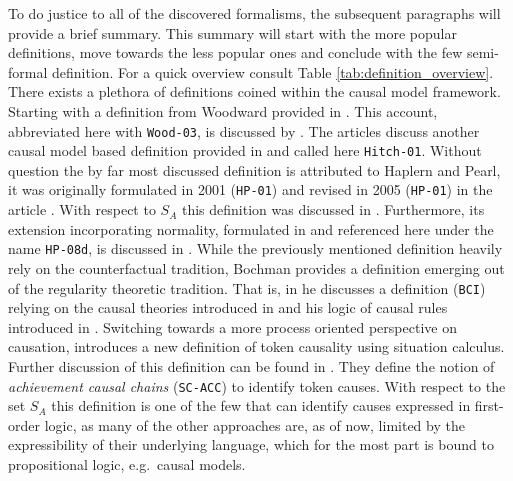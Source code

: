 \documentclass[11pt,a4paper]{book}
\theoremstyle{definition}
\theoremstyle{definition}
\theoremstyle{definition}
\theoremstyle{remark}
\newcommand{\prset}{S_{A}}
\begin{document}
To do justice to all of the discovered formalisms, the subsequent paragraphs will provide a brief summary. This summary will start with the more popular definitions, move towards the less popular ones and conclude with the few semi-formal definition. For a quick overview consult Table \ref{tab:definition_overview}.
There exists a plethora of definitions coined within the causal model framework. 
Starting with a definition from Woodward provided in \parencite{woodward2005making}. This account, abbreviated here with \texttt{Wood-03}, is discussed by \parencite{weslake2015partial,glymour2010actual}. 
The articles \parencite{weslake2015partial, blanchard2017cause} discuss another causal model based definition provided in \parencite{hitchcock2001intransitivity} and called here \texttt{Hitch-01}.
Without question the by far most discussed definition is attributed to Haplern and Pearl, it was originally formulated in 2001 (\texttt{HP-01}) and revised in 2005 (\texttt{HP-01}) in the article \parencite{halpern2005causes}. With respect to $\prset$ this definition was discussed in \parencite{glymour2010actual,gerstenberg2010spreading,weslake2015partial,chockler2015causal,
ibeling2018conditional,beckers2018principled,denecker2018causal,batusov2018situation,liepicna2020arguing,khannecessary,halpern2011actual,halpern2015graded,beckers2016general,halpern2016appropriate}. Furthermore, its extension incorporating normality, formulated in \parencite{halpern2008defaults} and referenced here under the name \texttt{HP-08d}, is discussed in \parencite{halpern2011actual,halpern2015graded,beckers2016general,halpern2016appropriate}. 
 While the previously mentioned definition heavily rely on the counterfactual tradition, Bochman provides a definition emerging out of the regularity theoretic tradition. That is, in  \parencite{bochman2018laws,bochman2018actual} he discusses a definition (\texttt{BCI}) relying on the causal theories introduced in \parencite{mccain1997causal} and his logic of causal rules introduced in \parencite{bochman2004causal}.
Switching towards a more process oriented perspective on causation, \parencite{batusov2018situation} introduces a new definition of token causality using situation calculus. Further discussion of this definition can be found in \parencite{khannecessary}. They define the notion of \emph{achievement causal chains} (\texttt{SC-ACC}) to identify token causes.  With respect to the set $\prset$ this definition is one of the few that can identify causes expressed in first-order logic, as many of the other approaches are, as of now, limited by the expressibility of their underlying language, which for the most part is bound to propositional logic, e.g.\ causal models. 
\end{document}
